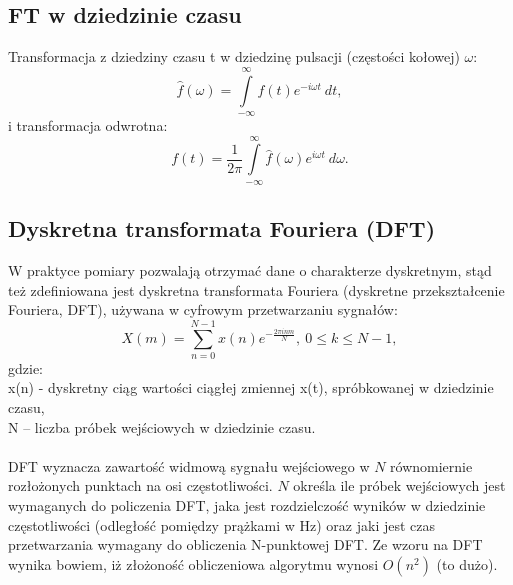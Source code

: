 \documentclass[a4paper,twoside]{report}
\begin{document}
\subsection{FT w dziedzinie czasu}
Transformacja z dziedziny czasu t w dziedzinę pulsacji (częstości kołowej) $\omega$:
\begin{equation}
\hat{f}(\omega) =\int\limits_{-\infty}^{\infty}f(t)e^{-i\omega t}~dt,
\end{equation}
i transformacja odwrotna:
\begin{equation}
f(t) = \frac{1}{2\pi} \int\limits_{-\infty}^{\infty}\hat{f}(\omega)e^{i\omega t}~d\omega.
\end{equation}


\subsection{Dyskretna transformata Fouriera (DFT)}
W praktyce pomiary pozwalają otrzymać dane o charakterze dyskretnym, stąd też zdefiniowana jest dyskretna transformata Fouriera (dyskretne przekształcenie Fouriera, DFT), używana w cyfrowym przetwarzaniu sygnałów:
\begin{equation}
X(m)= \sum_{n=0}^{N-1}{x(n) e^{- \frac{2 \pi i n m}{N}}}, \ 0 \le k \le N-1,
\end{equation}
gdzie:\\
x(n) - dyskretny ciąg wartości ciągłej zmiennej x(t), spróbkowanej w dziedzinie czasu, \\
N – liczba próbek wejściowych w dziedzinie czasu. \\\\
DFT wyznacza zawartość widmową sygnału wejściowego w $N$ równomiernie rozłożonych punktach na osi częstotliwości. $N$ określa ile próbek wejściowych jest wymaganych do policzenia DFT, jaka jest rozdzielczość wyników w dziedzinie częstotliwości (odległość pomiędzy prążkami w Hz) oraz jaki jest czas przetwarzania wymagany do obliczenia N-punktowej DFT. Ze wzoru na DFT wynika bowiem, iż złożoność obliczeniowa algorytmu wynosi $ O(n^2) $ (to dużo).
\end{document}
